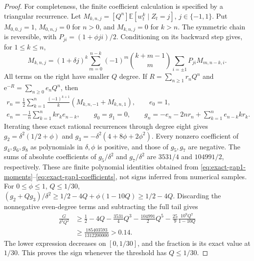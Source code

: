 \begin{proof}
For completeness, the finite coefficient calculation is specified by a triangular recurrence. Let \(M_{k,n,j}=[Q^n]\mathbb E[w_t^k\mid Z_t=j]\), \(j\in\{-1,1\}\). Put \(M_{0,0,j}=1\), \(M_{0,n,j}=0\) for \(n>0\), and \(M_{k,n,j}=0\) for \(k>n\). The symmetric chain is reversible, with \(P_{ji}=(1+\phi ji)/2\). Conditioning on its backward step gives, for \(1\leq k\leq n\),
\begin{equation}\label{eq:exact-gap1-moments}
 M_{k,n,j}=(1+\delta j)^k\sum_{m=0}^{n-k}(-1)^m
 {k+m-1\choose m}\sum_{i=\pm1}P_{ji}M_{m,n-k,i}.
\end{equation}
All terms on the right have smaller \(Q\) degree. If \(R=\sum_{n\geq1}r_nQ^n\) and \(\mathrm e^{-R}=\sum_{n\geq0}e_nQ^n\), then
\begin{equation}\label{eq:exact-gap1-coefficients}
 \begin{gathered}
 r_n=\frac12\sum_{k=1}^n\frac{(-1)^{k+1}}k(M_{k,n,-1}+M_{k,n,1}),\qquad e_0=1,\\
 e_n=-\frac1n\sum_{k=1}^nkr_ke_{n-k},\qquad
 g_0=g_1=0,\qquad g_n=-e_n-2nr_n+\sum_{k=1}^ne_{n-k}kr_k.
 \end{gathered}
\end{equation}
Iterating these exact rational recurrences through degree eight gives
\(g_2=\delta^2(1/2+\phi)\) and
\(g_3=-\delta^2(4+8\phi+2\phi^2)\).
Every nonzero coefficient of \(g_4,g_6,g_8\) as polynomials in \(\delta,\phi\) is positive, and those of \(g_5,g_7\) are negative. The sums of absolute coefficients of \(g_5/\delta^2\) and \(g_7/\delta^2\) are \(3531/4\) and \(104991/2\), respectively. These are finite polynomial identities obtained from \eqref{eq:exact-gap1-moments}--\eqref{eq:exact-gap1-coefficients}, not signs inferred from numerical samples.
For \(0\leq\phi\leq1\), \(Q\leq1/30\),
\((g_2+Qg_3)/\delta^2\geq1/2-4Q+\phi(1-10Q)\geq1/2-4Q\).
Discarding the nonnegative even-degree terms and subtracting the full tail gives
\begin{equation}\label{eq:exact-gap1-margin}
 \begin{split}
 \frac{G}{\delta^2Q^2}
 &\geq\frac12-4Q-\frac{3531}{4}Q^3-\frac{104991}{2}Q^5
       -\frac{25}{9}\frac{10^9Q^7}{1-10Q}\\
 &\geq\frac{185403593}{1312200000}>0.14.
 \end{split}
\end{equation}
The lower expression decreases on \([0,1/30]\), and the fraction is its exact value at \(1/30\). This proves the sign whenever the threshold has \(Q\leq1/30\).


\end{proof}
